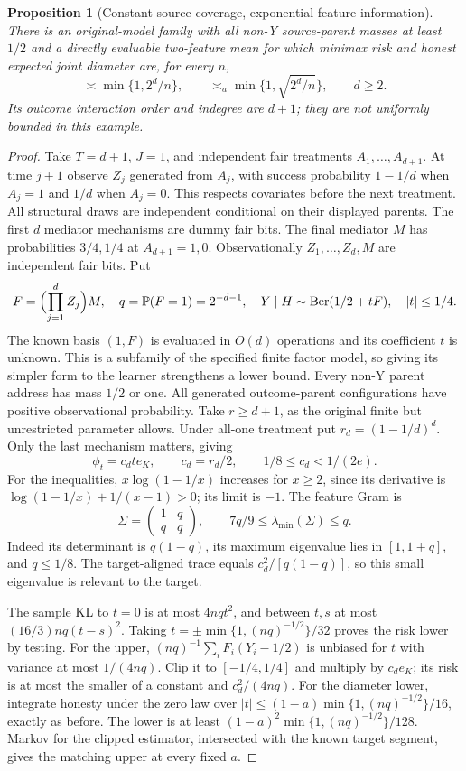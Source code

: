 \documentclass[11pt,a4paper]{article}
\numberwithin{equation}{section}
\newtheorem{proposition}[theorem]{Proposition}
\theoremstyle{definition}
\newcommand{\Prb}{\mathbb P}
\begin{document}
\begin{proposition}[Constant source coverage, exponential feature information]\label{prop:feature}
There is an original-model family with all non-Y source-parent masses
at least $1/2$ and a directly evaluable two-feature mean for which
minimax risk and honest expected joint diameter are, for every $n$,
\[
 \asymp\min\{1,2^d/n\},\qquad
 \asymp_a\min\{1,\sqrt{2^d/n}\},\qquad d\ge2.
\]
Its outcome interaction order and indegree are $d+1$; they are not
uniformly bounded in this example.
\end{proposition}
\begin{proof}
Take $T=d+1$, $J=1$, and independent fair treatments $A_1,\ldots,A_{d+1}$.
At time $j+1$ observe $Z_j$ generated from $A_j$, with success
probability $1-1/d$ when $A_j=1$ and $1/d$ when $A_j=0$.
This respects covariates before the next treatment. All structural
draws are independent conditional on their displayed parents. The
first $d$ mediator mechanisms are dummy fair bits. The final mediator
$M$ has probabilities $3/4,1/4$ at $A_{d+1}=1,0$. Observationally
$Z_1,\ldots,Z_d,M$ are independent fair bits. Put
\[
 F=\Bigl(\prod_{j=1}^d Z_j\Bigr)M,\quad
 q=\Prb(F=1)=2^{-d-1},\quad
 Y\mid H\sim\operatorname{Ber}(1/2+tF),\quad |t|\le1/4.
\]
The known basis $(1,F)$ is evaluated in $O(d)$ operations and its
coefficient $t$ is unknown. This is a subfamily of the specified finite
factor model, so giving its simpler form to the learner strengthens a
lower bound. Every non-Y parent address has mass $1/2$ or one.
All generated outcome-parent configurations have positive observational
probability. Take $r\ge d+1$, as the original finite but unrestricted
parameter allows. Under all-one treatment put $r_d=(1-1/d)^d$.
Only the last mechanism matters, giving
\[
 \phi_t=c_dt e_K,\qquad c_d=r_d/2,\qquad 1/8\le c_d<1/(2e).
\]
For the inequalities, $x\log(1-1/x)$ increases for $x\ge2$, since
its derivative is $\log(1-1/x)+1/(x-1)>0$; its limit is $-1$.
The feature Gram is
\[
 \Sigma=\begin{pmatrix}1&q\\q&q\end{pmatrix},\qquad
 7q/9\le\lambda_{\min}(\Sigma)\le q.
\]
Indeed its determinant is $q(1-q)$, its maximum eigenvalue lies in
$[1,1+q]$, and $q\le1/8$. The target-aligned trace equals
$c_d^2/[q(1-q)]$, so this small eigenvalue is relevant to the target.

The sample KL to $t=0$ is at most $4nqt^2$, and between $t,s$ at
most $(16/3)nq(t-s)^2$. Taking
$t=\pm\min\{1,(nq)^{-1/2}\}/32$ proves the risk lower by testing.
For the upper, $(nq)^{-1}\sum_i F_i(Y_i-1/2)$ is unbiased for $t$
with variance at most $1/(4nq)$. Clip it to $[-1/4,1/4]$ and multiply
by $c_de_K$; its risk is at most the smaller of a constant and
$c_d^2/(4nq)$.
For the diameter lower, integrate honesty under the zero law over
$|t|\le(1-a)\min\{1,(nq)^{-1/2}\}/16$, exactly as before.
The lower is at least $(1-a)^2\min\{1,(nq)^{-1/2}\}/128$.
Markov for the clipped estimator, intersected with the known target
segment, gives the matching upper at every fixed $a$.
\end{proof}
\end{document}

